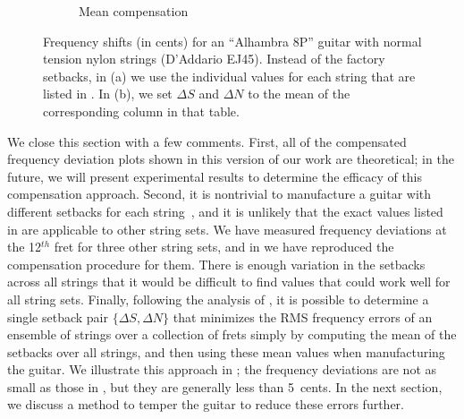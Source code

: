 \begin{figure}
\begin{subfigure}[b]{0.8\textwidth}
   \caption{Mean compensation}
   \label{fig:shift_classicalguitar_ej45_mean}
  \end{subfigure}
  \caption{\label{fig:compensation_classicalguitar_ej45} Frequency shifts (in cents) for an ``Alhambra 8P'' guitar with normal tension nylon strings (D'Addario EJ45). Instead of the factory setbacks, in (a) we use the individual values for each string that are listed in . In (b), we set $\Delta S$ and $\Delta N$ to the mean of the corresponding column in that table.}
 \end{figure}

We close this section with a few comments. First, all of the compensated frequency deviation plots shown in this version of our work are theoretical; in the future, we will present experimental results to determine the efficacy of this compensation approach. Second, it is nontrivial to manufacture a guitar with different setbacks for each string~\cite{ref:byers1996cgi}, and it is unlikely that the exact values listed in  are applicable to other string sets. We have measured frequency deviations at the 12$^{th}$ fret for three other string sets, and in  we have reproduced the compensation procedure for them. There is enough variation in the setbacks across all strings that it would be difficult to find values that could work well for all string sets. Finally, following the analysis of , it is possible to determine a single setback pair $\{\Delta S, \Delta N\}$ that minimizes the RMS frequency errors of an ensemble of strings over a collection of frets simply by computing the mean of the setbacks over all strings, and then using these mean values when manufacturing the guitar. We illustrate this approach in ; the frequency deviations are not as small as those in , but they are generally less than 5~cents. In the next section, we discuss a method to temper the guitar to reduce these errors further. 